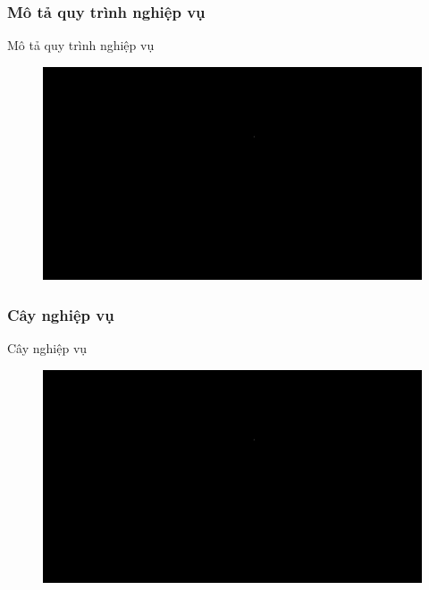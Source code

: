 \documentclass{beamer}
\begin{document}
\subsubsection{Mô tả quy trình nghiệp vụ}
\begin{frame}{Mô tả quy trình nghiệp vụ}
\begin{figure}[H]
\centering
\includegraphics[scale = 0.3]{pictures/black.png}
\end{figure}
\end{frame}
\subsubsection{Cây nghiệp vụ}
\begin{frame}{Cây nghiệp vụ}
\begin{figure}[H]
\centering
\includegraphics[scale = 0.3]{pictures/black.png}
\end{figure}
\end{frame}

\end{document}
